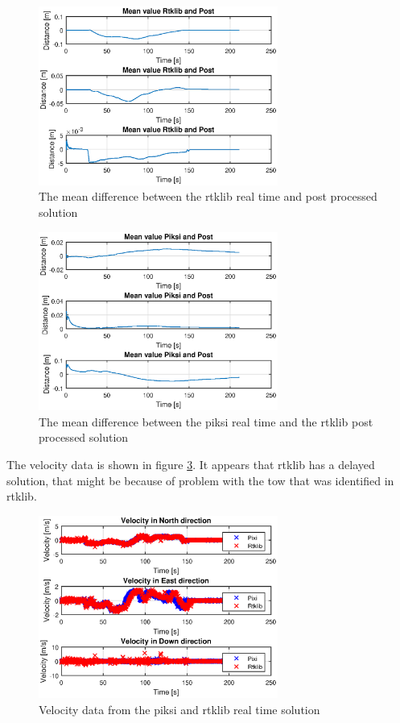 \begin{figure}[H]
	\centering
		\includegraphics[width=0.7\textwidth]{figs/plots/meanrtkpost.eps}
		\caption{The mean difference between the rtklib real time and post processed solution}
		\label{figure:RTKLIB_STRUCTURE}
\end{figure}
\begin{figure}[H]
	\centering
		\includegraphics[width=0.7\textwidth]{figs/plots/meanpiksipost.eps}
		\caption{The mean difference between the piksi real time and the rtklib post processed solution}
		\label{figure:RTKLIB_STRUCTURE}
\end{figure}
The velocity data is shown in figure \ref{figure:VelocityWalk1}. It appears that rtklib has a delayed solution, that might be because of problem with the \gls{tow} that was identified in rtklib.
\begin{figure}[H]
	\centering
		\includegraphics[width=0.7\textwidth]{figs/plots/velocity.eps}
		\caption{Velocity data from the piksi and rtklib real time solution}
		\label{figure:VelocityWalk1}
\end{figure}
